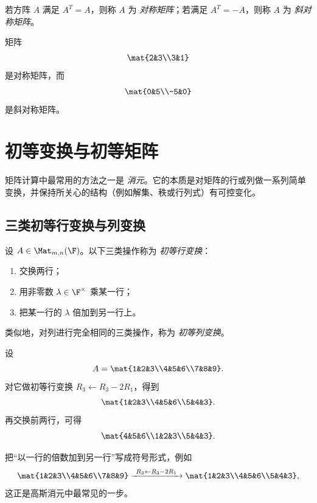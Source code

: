 \begin{definition}
若方阵 $A$ 满足 $A^T=A$，则称 $A$ 为 \emph{对称矩阵}；若满足 $A^T=-A$，则称 $A$ 为 \emph{斜对称矩阵}。
\end{definition}

\begin{example}
矩阵
\[
\mat{2&3\\3&1}
\]
是对称矩阵，而
\[
\mat{0&5\\-5&0}
\]
是斜对称矩阵。
\end{example}

\section{初等变换与初等矩阵}

矩阵计算中最常用的方法之一是 \emph{消元}。它的本质是对矩阵的行或列做一系列简单变换，并保持所关心的结构（例如解集、秩或行列式）有可控变化。

\subsection{三类初等行变换与列变换}

\begin{definition}
设 $A\in\Mat_{m,n}(\F)$。以下三类操作称为 \emph{初等行变换}：
\begin{enumerate}[label=(\arabic*)]
  \item 交换两行；
  \item 用非零数 $\lambda\in\F^\times$ 乘某一行；
  \item 把某一行的 $\lambda$ 倍加到另一行上。
\end{enumerate}
类似地，对列进行完全相同的三类操作，称为 \emph{初等列变换}。
\end{definition}

\begin{example}
设
\[
A=\mat{1&2&3\\4&5&6\\7&8&9}.
\]
对它做初等行变换 $R_3\leftarrow R_3-2R_1$，得到
\[
\mat{1&2&3\\4&5&6\\5&4&3}.
\]
再交换前两行，可得
\[
\mat{4&5&6\\1&2&3\\5&4&3}.
\]
\end{example}

把“以一行的倍数加到另一行”写成符号形式，例如
\[
\mat{1&2&3\\4&5&6\\7&8&9}
\xrightarrow{\ R_3\leftarrow R_3-2R_1\ }
\mat{1&2&3\\4&5&6\\5&4&3},
\]
这正是高斯消元中最常见的一步。


